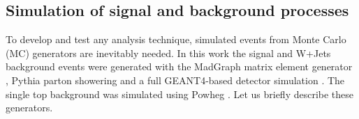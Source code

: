 
\subsection{Simulation of signal and background processes}
\label{ss_top_mass:signal_and_background}

To develop and test any analysis technique, simulated events from Monte Carlo (MC) generators are inevitably needed. In
this work the \ttbar signal and W+Jets background events were generated with the MadGraph matrix element generator
\autocite{MadGraph}, Pythia parton showering \autocite{Pythia} and a full GEANT4-based detector simulation
\autocite{GEANT4}. The single top background was simulated using Powheg \autocite{POWHEG}. Let us briefly describe these
generators.


